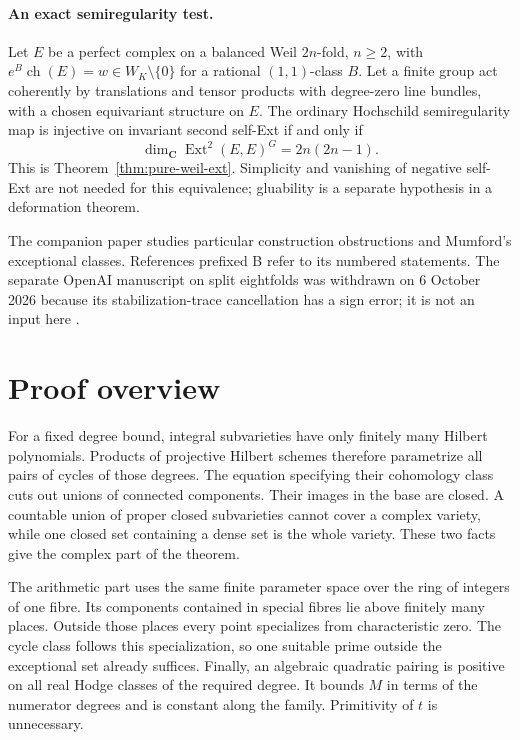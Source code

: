 \documentclass[11pt]{article}
\theoremstyle{definition}
\theoremstyle{remark}
\newcommand{\C}{\mathbf C}
\begin{document}
\paragraph{An exact semiregularity test.}
Let $E$ be a perfect complex on a balanced Weil $2n$-fold, $n\ge2$,
with $e^B\operatorname{ch}(E)=w\in W_K\setminus\{0\}$ for a rational
$(1,1)$-class $B$. Let a finite group act coherently by translations
and tensor products with degree-zero line bundles, with a chosen
equivariant structure on $E$. The ordinary Hochschild semiregularity
map is injective on invariant second self-Ext if and only if
\[
\dim_{\C}\operatorname{Ext}^2(E,E)^G=2n(2n-1).
\]
This is Theorem~\ref{thm:pure-weil-ext}. Simplicity and vanishing of
negative self-Ext are not needed for this equivalence; gluability
is a separate hypothesis in a deformation theorem.

The companion paper \cite{CompanionB} studies particular construction
obstructions and Mumford's exceptional classes. References prefixed B
refer to its numbered statements.
The separate OpenAI manuscript on split eightfolds was withdrawn on
6 October 2026 because its stabilization-trace cancellation has a sign
error; it is not an input here \cite{OpenAIEightWithdrawn}.

\section{Proof overview}\label{sec:overview}

For a fixed degree bound, integral subvarieties have only finitely many Hilbert polynomials. Products of projective Hilbert schemes therefore parametrize all pairs of cycles of those degrees. The equation specifying their cohomology class cuts out unions of connected components. Their images in the base are closed. A countable union of proper closed subvarieties cannot cover a complex variety, while one closed set containing a dense set is the whole variety. These two facts give the complex part of the theorem.

The arithmetic part uses the same finite parameter space over the ring of integers of one fibre. Its components contained in special fibres lie above finitely many places. Outside those places every point specializes from characteristic zero. The cycle class follows this specialization, so one suitable prime outside the exceptional set already suffices. Finally, an algebraic quadratic pairing is positive on all real Hodge classes of the required degree. It bounds $M$ in terms of the numerator degrees and is constant along the family. Primitivity of $t$ is unnecessary.
\end{document}
